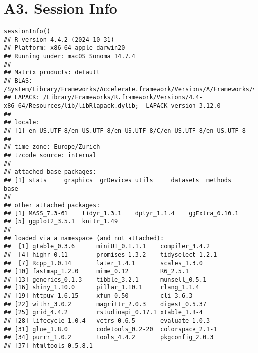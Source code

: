
\section*{A3. Session Info}



\begin{scriptsize}
\begin{knitrout}
\color{fgcolor}\begin{kframe}
\begin{verbatim}
sessionInfo()
## R version 4.4.2 (2024-10-31)
## Platform: x86_64-apple-darwin20
## Running under: macOS Sonoma 14.7.4
## 
## Matrix products: default
## BLAS:   /System/Library/Frameworks/Accelerate.framework/Versions/A/Frameworks/vecLib.framework/Versions/A/libBLAS.dylib 
## LAPACK: /Library/Frameworks/R.framework/Versions/4.4-x86_64/Resources/lib/libRlapack.dylib;  LAPACK version 3.12.0
## 
## locale:
## [1] en_US.UTF-8/en_US.UTF-8/en_US.UTF-8/C/en_US.UTF-8/en_US.UTF-8
## 
## time zone: Europe/Zurich
## tzcode source: internal
## 
## attached base packages:
## [1] stats     graphics  grDevices utils     datasets  methods   base     
## 
## other attached packages:
## [1] MASS_7.3-61    tidyr_1.3.1    dplyr_1.1.4    ggExtra_0.10.1
## [5] ggplot2_3.5.1  knitr_1.49    
## 
## loaded via a namespace (and not attached):
##  [1] gtable_0.3.6      miniUI_0.1.1.1    compiler_4.4.2   
##  [4] highr_0.11        promises_1.3.2    tidyselect_1.2.1 
##  [7] Rcpp_1.0.14       later_1.4.1       scales_1.3.0     
## [10] fastmap_1.2.0     mime_0.12         R6_2.5.1         
## [13] generics_0.1.3    tibble_3.2.1      munsell_0.5.1    
## [16] shiny_1.10.0      pillar_1.10.1     rlang_1.1.4      
## [19] httpuv_1.6.15     xfun_0.50         cli_3.6.3        
## [22] withr_3.0.2       magrittr_2.0.3    digest_0.6.37    
## [25] grid_4.4.2        rstudioapi_0.17.1 xtable_1.8-4     
## [28] lifecycle_1.0.4   vctrs_0.6.5       evaluate_1.0.3   
## [31] glue_1.8.0        codetools_0.2-20  colorspace_2.1-1 
## [34] purrr_1.0.2       tools_4.4.2       pkgconfig_2.0.3  
## [37] htmltools_0.5.8.1
\end{verbatim}
\end{kframe}
\end{knitrout}
\end{scriptsize}


